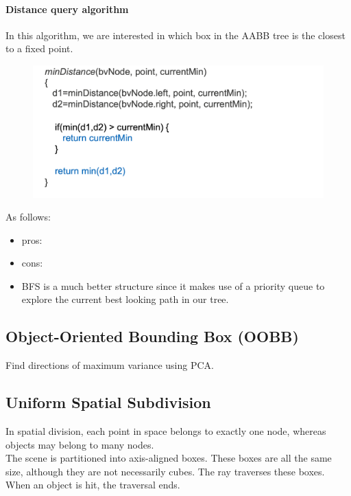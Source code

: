 \documentclass[11pt]{article}
\numberwithin{equation}{section}
\begin{document}
\paragraph{Distance query algorithm}
In this algorithm, we are interested in which box in the AABB tree is the closest to a fixed point.
	\begin{figure}[H]
	\centering
	\includegraphics[scale=0.4]{p10}
	\end{figure}
As follows:
\begin{itemize}
	\item pros: 
	\item cons: 
	\item BFS is a much better structure since it makes use of a priority queue to explore the current best looking path in our tree.
\end{itemize}


\subsection{Object-Oriented Bounding Box (OOBB)}
Find directions of maximum variance using PCA.


\subsection{Uniform Spatial Subdivision}
In spatial division, each point in space belongs to exactly one node, whereas objects may belong to many nodes.\\
The scene is partitioned into axis-aligned boxes. These boxes are all the same size, although they are not necessarily cubes. The ray traverses these boxes. When an object is hit, the traversal ends.
\end{document}
